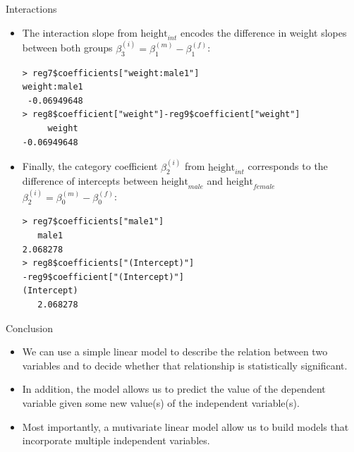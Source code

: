 \documentclass[handout]{beamer}
\begin{document}
\begin{frame}[fragile]{Interactions}
\scriptsize{ 
\begin{itemize}
\item  The interaction slope from $\text{height}_{int}$  encodes the difference in weight slopes between both groups $\beta_3^{(i)}=\beta_1^{(m)}-\beta_1^{(f)}$:
 
 \begin{verbatim}
> reg7$coefficients["weight:male1"]
weight:male1 
 -0.06949648 
> reg8$coefficient["weight"]-reg9$coefficient["weight"]
     weight 
-0.06949648 
 \end{verbatim}


\item Finally, the category coefficient $\beta_2^{(i)}$  from  $\text{height}_{int}$ corresponds to the difference of intercepts between  $\text{height}_{male}$ and  $\text{height}_{female}$
$\beta_2^{(i)}=\beta_0^{(m)}-\beta_0^{(f)}$: 



\begin{verbatim}
> reg7$coefficients["male1"]
   male1 
2.068278 
> reg8$coefficients["(Intercept)"]
-reg9$coefficient["(Intercept)"]
(Intercept) 
   2.068278  
\end{verbatim}
 
 
 
\end{itemize}





}
\end{frame}


\begin{frame}{Conclusion}
 
 \scriptsize{
 \begin{itemize}
  \item We can use a simple linear model to describe the relation between two variables and to decide whether that relationship is statistically significant.
  
  \item In addition, the model allows us to predict the value of the dependent variable given some new value(s) of the independent variable(s).
  
  \item Most importantly, a mutivariate linear model allow us to build models that incorporate multiple independent variables.
 


 \end{itemize}
 }
 
\end{frame}
\end{document}
